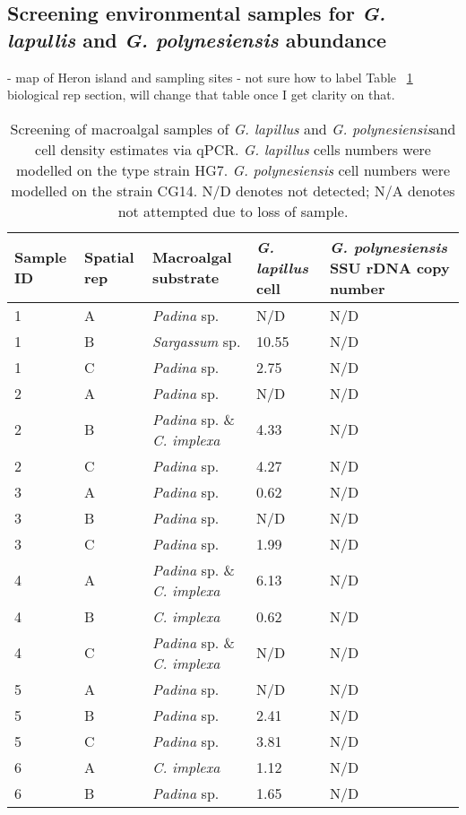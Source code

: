 \documentclass[12pt]{article}
\begin{document}
\subsection{Screening environmental samples for \emph{G. lapullis} and \emph{G. polynesiensis} abundance}
- map of Heron island and sampling sites
- not sure how to label Table ~\ref{tbl:MacroalgaeTable} biological rep section, will change that table once I get clarity on that.
\FloatBarrier
\begin{longtable}{ | p{1cm} | p{1cm} | p{3cm} | p{4cm} | p{4cm} | }
\caption{Screening of macroalgal samples of \emph{G. lapillus} and \emph{G. polynesiensis}and cell density estimates via qPCR. \emph{G. lapillus} cells numbers were modelled on the type strain HG7. \emph{G. polynesiensis} cell numbers were modelled on the strain CG14. N/D denotes not detected; N/A denotes not attempted due to loss of sample.}\\
\hline
\label{tbl:MacroalgaeTable}
\textbf{Sample ID}&\textbf{Spatial rep}&\textbf{Macroalgal substrate}&\textbf{\textit{G. lapillus} cell}&\textbf{\textit{G. polynesiensis} SSU rDNA copy number }\\
\hline
1&A&\emph{Padina} sp.&N/D&N/D\\
\hline
1&B&\emph{Sargassum} sp.&10.55
&N/D\\
\hline
1&C&\emph{Padina} sp.&2.75
&N/D\\
\hline
2&A&\emph{Padina} sp.&N/D&N/D\\
\hline
2&B&\emph{Padina} sp. \& \emph{C. implexa}&4.33
&N/D\\
\hline
2&C&\emph{Padina} sp.&4.27
&N/D\\
\hline
3&A&\emph{Padina} sp.&0.62
&N/D\\
\hline
3&B&\emph{Padina} sp.&N/D&N/D\\
\hline
3&C&\emph{Padina} sp.&1.99
&N/D\\
\hline
4&A&\emph{Padina} sp. \& \emph{C. implexa}&6.13
&N/D\\
\hline
4&B&\emph{C. implexa}&0.62
&N/D\\
\hline
4&C&\emph{Padina} sp. \& \emph{C. implexa}&N/D&N/D\\
\hline
5&A&\emph{Padina} sp.&N/D&N/D\\
\hline
5&B&\emph{Padina} sp.&2.41
&N/D\\
\hline
5&C&\emph{Padina} sp.&3.81
&N/D\\
\hline
6&A&\emph{C. implexa}&1.12
&N/D\\
\hline
6&B&\emph{Padina} sp.&1.65
&N/D\\

\end{longtable}
\end{document}
